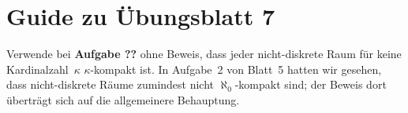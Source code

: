 \documentclass{uebblatt}
\begin{document}
\section*{Guide zu Übungsblatt 7}

Verwende bei \textbf{Aufgabe ??} ohne Beweis, dass jeder nicht-diskrete Raum für keine
Kardinalzahl~$\kappa$ $\kappa$-kompakt ist. In Aufgabe~2 von Blatt~5 hatten wir
gesehen, dass nicht-diskrete Räume zumindest nicht $\aleph_0$-kompakt sind; der
Beweis dort überträgt sich auf die allgemeinere Behauptung.
\end{document}
